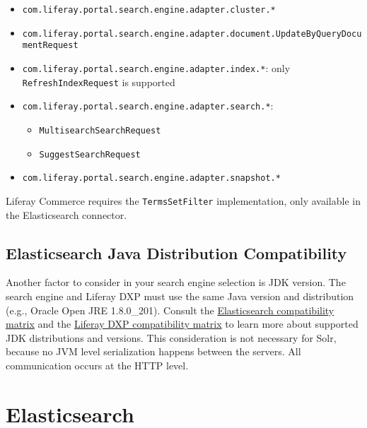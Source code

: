 \begin{itemize}
  \begin{itemize}
  \tightlist
  \item
    \texttt{com.liferay.portal.search.engine.adapter.cluster.*}
  \item
    \texttt{com.liferay.portal.search.engine.adapter.document.UpdateByQueryDocumentRequest}
  \item
    \texttt{com.liferay.portal.search.engine.adapter.index.*}: only
    \texttt{RefreshIndexRequest} is supported
  \item
    \texttt{com.liferay.portal.search.engine.adapter.search.*}:

    \begin{itemize}
    \tightlist
    \item
      \texttt{MultisearchSearchRequest}
    \item
      \texttt{SuggestSearchRequest}
    \end{itemize}
  \item
    \texttt{com.liferay.portal.search.engine.adapter.snapshot.*}
  \end{itemize}
\end{itemize}

Liferay Commerce requires the \texttt{TermsSetFilter} implementation,
only available in the Elasticsearch connector.

\section{Elasticsearch Java Distribution
Compatibility}\label{elasticsearch-java-distribution-compatibility}

Another factor to consider in your search engine selection is JDK
version. The search engine and Liferay DXP must use the same Java
version and distribution (e.g., Oracle Open JRE 1.8.0\_201). Consult the
\href{https://www.elastic.co/support/matrix\#matrix_jvm}{Elasticsearch
compatibility matrix} and the
\href{https://help.liferay.com/hc/en-us/sections/360002103292-Compatibility-Matrix}{Liferay
DXP compatibility matrix} to learn more about supported JDK
distributions and versions. This consideration is not necessary for
Solr, because no JVM level serialization happens between the servers.
All communication occurs at the HTTP level.

\chapter{Elasticsearch}\label{elasticsearch}

